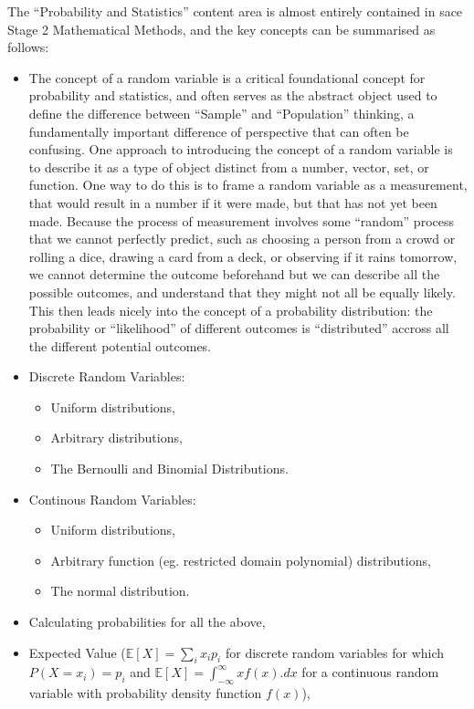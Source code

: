 \documentclass[twoside,12pt,a4paper]{report}
\begin{document}
The ``Probability and Statistics'' content area is almost entirely contained in \gls{sace} Stage 2 Mathematical Methods, and the key concepts can be summarised as follows:
\begin{itemize}
	\item The concept of a random variable is a critical foundational concept for probability and statistics, and often serves as the abstract object used to define the difference between ``Sample'' and ``Population'' thinking, a fundamentally important difference of perspective that can often be confusing. One approach to introducing the concept of a random variable is to describe it as a type of object distinct from a number, vector, set, or function. One way to do this is to frame a random variable as a measurement, that would result in a number if it were made, but that has not yet been made. Because the process of measurement involves some ``random'' process that we cannot perfectly predict, such as choosing a person from a crowd or rolling a dice, drawing a card from a deck, or observing if it rains tomorrow, we cannot determine the outcome beforehand but we can describe all the possible outcomes, and understand that they might not all be equally likely. This then leads nicely into the concept of a probability distribution: the probability or ``likelihood'' of different outcomes is ``distributed'' accross all the different potential outcomes.
	\item Discrete Random Variables: 
		\begin{itemize}
			\item Uniform distributions,
			\item Arbitrary distributions,
			\item The Bernoulli and Binomial Distributions.
		\end{itemize}
	\item Continous Random Variables:
		\begin{itemize}
			\item Uniform distributions,
			\item Arbitrary function (eg. restricted domain polynomial) distributions,
			\item The normal distribution.
		\end{itemize}
	\item Calculating probabilities for all the above,
	\item Expected Value ($\mathbb{E}[X] = \sum_i{x_ip_i}$ for discrete random variables for which $P(X = x_i) = p_i$ and $\mathbb{E}[X] = \int_{-\infty}^\infty{xf(x).dx}$ for a continuous random variable with probability density function $f(x)$), 

\end{itemize}
\end{document}
